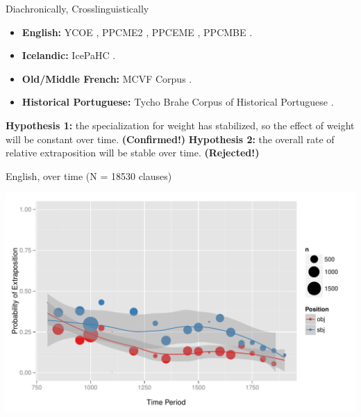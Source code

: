 \documentclass[hyperref={pdfpagelabels=false}]{beamer}
\begin{document}
\begin{frame}{Diachronically, Crosslinguistically}
\begin{itemize}
	\item \textbf{English:} YCOE \citep{ycoe}, PPCME2 \citep{ppcme2}, PPCEME \citep{ppceme}, PPCMBE \citep{ppcmbe}.
	\item \textbf{Icelandic:} IcePaHC \citep{icepahc09}.
	\item \textbf{Old/Middle French:} MCVF Corpus \citep{mcvf}.
	\item \textbf{Historical Portuguese:} Tycho Brahe Corpus of Historical Portuguese \citep{tychobrahe}.
	\end{itemize}
	\textbf{Hypothesis 1:} the specialization for weight has stabilized, so the effect of weight will be constant over time. \textbf{(Confirmed!)}
	\textbf{Hypothesis 2:} the overall rate of relative extraposition will be stable over time. \textbf{(Rejected!)}

\end{frame}

\begin{frame}{English, over time (N = 18530 clauses)}

\begin{center}
\includegraphics[width=1.1\textwidth]{exSbjObjYearBinned50Loessymeb.pdf}
\end{center}
\end{frame}
\end{document}
